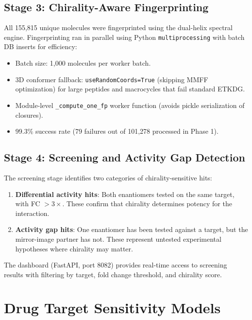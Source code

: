 \documentclass[11pt,a4paper]{article}
\begin{document}
\subsection{Stage 3: Chirality-Aware Fingerprinting}

All 155,815 unique molecules were fingerprinted using the dual-helix spectral
engine. Fingerprinting ran in parallel using Python \texttt{multiprocessing}
with batch DB inserts for efficiency:

\begin{itemize}[leftmargin=1.5em]
  \item Batch size: 1,000 molecules per worker batch.
  \item 3D conformer fallback: \texttt{useRandomCoords=True} (skipping MMFF
    optimization) for large peptides and macrocycles that fail standard ETKDG.
  \item Module-level \texttt{\_compute\_one\_fp} worker function (avoids
    pickle serialization of closures).
  \item 99.3\% success rate (79 failures out of 101,278 processed in Phase 1).
\end{itemize}

\subsection{Stage 4: Screening and Activity Gap Detection}

The screening stage identifies two categories of chirality-sensitive hits:

\begin{enumerate}[leftmargin=1.5em]
  \item \textbf{Differential activity hits}: Both enantiomers tested on the
    same target, with FC $> 3\times$. These confirm that chirality determines
    potency for the interaction.
  \item \textbf{Activity gap hits}: One enantiomer has been tested against a
    target, but the mirror-image partner has not. These represent untested
    experimental hypotheses where chirality may matter.
\end{enumerate}

The dashboard (FastAPI, port 8082) provides real-time access to screening
results with filtering by target, fold change threshold, and chirality score.

\newpage

\section{Drug Target Sensitivity Models}
\label{sec:targets}
\end{document}
